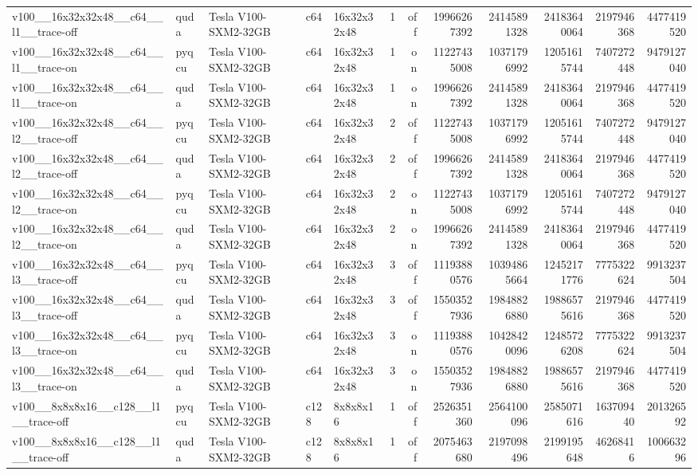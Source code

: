 \begin{table}[htbp]
\begin{tabular}{@{}lllllrrrrrrr@{}}
v100\_\_16x32x32x48\_\_c64\_\_l1\_\_trace-off & quda & Tesla V100-SXM2-32GB & c64 & 16x32x32x48 & 1 & off & 19966267392 & 24145891328 & 24183640064 & 2197946368 & 4477419520 \\
v100\_\_16x32x32x48\_\_c64\_\_l1\_\_trace-on & pyqcu & Tesla V100-SXM2-32GB & c64 & 16x32x32x48 & 1 & on & 11227435008 & 10371796992 & 12051615744 & 7407272448 & 9479127040 \\
v100\_\_16x32x32x48\_\_c64\_\_l1\_\_trace-on & quda & Tesla V100-SXM2-32GB & c64 & 16x32x32x48 & 1 & on & 19966267392 & 24145891328 & 24183640064 & 2197946368 & 4477419520 \\
v100\_\_16x32x32x48\_\_c64\_\_l2\_\_trace-off & pyqcu & Tesla V100-SXM2-32GB & c64 & 16x32x32x48 & 2 & off & 11227435008 & 10371796992 & 12051615744 & 7407272448 & 9479127040 \\
v100\_\_16x32x32x48\_\_c64\_\_l2\_\_trace-off & quda & Tesla V100-SXM2-32GB & c64 & 16x32x32x48 & 2 & off & 19966267392 & 24145891328 & 24183640064 & 2197946368 & 4477419520 \\
v100\_\_16x32x32x48\_\_c64\_\_l2\_\_trace-on & pyqcu & Tesla V100-SXM2-32GB & c64 & 16x32x32x48 & 2 & on & 11227435008 & 10371796992 & 12051615744 & 7407272448 & 9479127040 \\
v100\_\_16x32x32x48\_\_c64\_\_l2\_\_trace-on & quda & Tesla V100-SXM2-32GB & c64 & 16x32x32x48 & 2 & on & 19966267392 & 24145891328 & 24183640064 & 2197946368 & 4477419520 \\
v100\_\_16x32x32x48\_\_c64\_\_l3\_\_trace-off & pyqcu & Tesla V100-SXM2-32GB & c64 & 16x32x32x48 & 3 & off & 11193880576 & 10394865664 & 12452171776 & 7775322624 & 9913237504 \\
v100\_\_16x32x32x48\_\_c64\_\_l3\_\_trace-off & quda & Tesla V100-SXM2-32GB & c64 & 16x32x32x48 & 3 & off & 15503527936 & 19848826880 & 19886575616 & 2197946368 & 4477419520 \\
v100\_\_16x32x32x48\_\_c64\_\_l3\_\_trace-on & pyqcu & Tesla V100-SXM2-32GB & c64 & 16x32x32x48 & 3 & on & 11193880576 & 10428420096 & 12485726208 & 7775322624 & 9913237504 \\
v100\_\_16x32x32x48\_\_c64\_\_l3\_\_trace-on & quda & Tesla V100-SXM2-32GB & c64 & 16x32x32x48 & 3 & on & 15503527936 & 19848826880 & 19886575616 & 2197946368 & 4477419520 \\
v100\_\_8x8x8x16\_\_c128\_\_l1\_\_trace-off & pyqcu & Tesla V100-SXM2-32GB & c128 & 8x8x8x16 & 1 & off & 2526351360 & 2564100096 & 2585071616 & 163709440 & 201326592 \\
v100\_\_8x8x8x16\_\_c128\_\_l1\_\_trace-off & quda & Tesla V100-SXM2-32GB & c128 & 8x8x8x16 & 1 & off & 2075463680 & 2197098496 & 2199195648 & 46268416 & 100663296 \\

\end{tabular}
\end{table}
